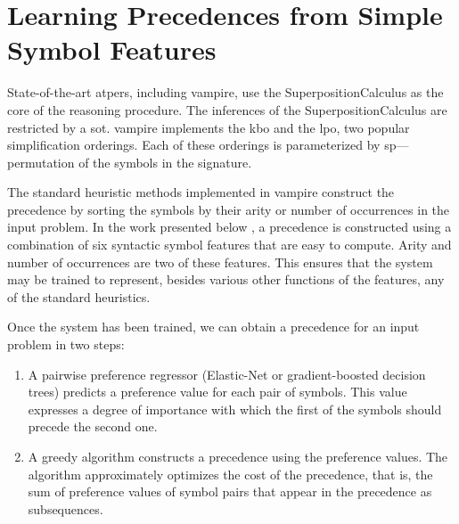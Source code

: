 \newcommand*{\IncludePaper}[2][height=\paperheight-1.5in]{}

\newcommand{\ResultSection}{\chapter}


\ResultSection{Learning Precedences from Simple Symbol Features}
\label{sec:results:simple}

State-of-the-art \glspl{atper}, including \gls{vampire}, use the \gls{SuperpositionCalculus} as the core of the reasoning procedure.
The inferences of the \gls{SuperpositionCalculus} are restricted by a \gls{sot}.
\Gls{vampire} implements the \acrfull{kbo} and the \gls{lpo}, two popular simplification orderings.
Each of these orderings is parameterized by \gls{sp}---permutation of the symbols in the signature.

The standard heuristic methods implemented in \gls{vampire} construct the \gls{precedence} by sorting the symbols by their arity or number of occurrences in the input problem.
In the work presented below \cite{DBLP:conf/cade/Bartek020},
a \gls{precedence} is constructed using a combination of six syntactic symbol features that are easy to compute.
Arity and number of occurrences are two of these features.
This ensures that the system may be trained to represent, besides various other functions of the features, any of the standard heuristics.

Once the system has been trained,
we can obtain a precedence for an input problem in two steps:
\begin{enumerate}
\item A pairwise preference regressor (Elastic-Net or gradient-boosted decision trees) predicts a preference value for each pair of symbols.
This value expresses a degree of importance with which the first of the symbols should precede the second one.
\item A greedy algorithm constructs a precedence using the preference values.
The algorithm approximately optimizes the cost of the precedence, that is,
the sum of preference values of symbol pairs that appear in the precedence as subsequences.
\end{enumerate}

